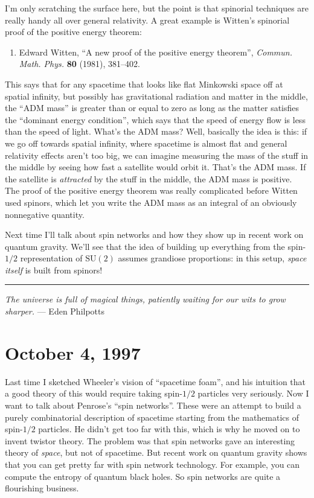 \documentclass{article}
\def\tightlist{}
\begin{document}
I'm only scratching the surface here, but the point is that spinorial
techniques are really handy all over general relativity. A great example
is Witten's spinorial proof of the positive energy theorem:

\begin{enumerate}
\def\labelenumi{\arabic{enumi})}
\setcounter{enumi}{5}
\tightlist
\item
  Edward Witten, ``A new proof of the positive energy theorem'',
  \emph{Commun. Math. Phys.} \textbf{80} (1981), 381--402.
\end{enumerate}

This says that for any spacetime that looks like flat Minkowski space
off at spatial infinity, but possibly has gravitational radiation and
matter in the middle, the ``ADM mass'' is greater than or equal to zero
as long as the matter satisfies the ``dominant energy condition'', which
says that the speed of energy flow is less than the speed of light.
What's the ADM mass? Well, basically the idea is this: if we go off
towards spatial infinity, where spacetime is almost flat and general
relativity effects aren't too big, we can imagine measuring the mass of
the stuff in the middle by seeing how fast a satellite would orbit it.
That's the ADM mass. If the satellite is \emph{attracted} by the stuff
in the middle, the ADM mass is positive. The proof of the positive
energy theorem was really complicated before Witten used spinors, which
let you write the ADM mass as an integral of an obviously nonnegative
quantity.

Next time I'll talk about spin networks and how they show up in recent
work on quantum gravity. We'll see that the idea of building up
everything from the spin-\(1/2\) representation of \(\mathrm{SU}(2)\)
assumes grandiose proportions: in this setup, \emph{space itself} is
built from spinors!

\begin{center}\rule{0.5\linewidth}{0.5pt}\end{center}

\emph{The universe is full of magical things, patiently waiting for our
wits to grow sharper.} --- Eden Philpotts
\hypertarget{week110}{%
\section{October 4, 1997}\label{week110}}

Last time I sketched Wheeler's vision of ``spacetime foam'', and his
intuition that a good theory of this would require taking spin-\(1/2\)
particles very seriously. Now I want to talk about Penrose's ``spin
networks''. These were an attempt to build a purely combinatorial
description of spacetime starting from the mathematics of spin-\(1/2\)
particles. He didn't get too far with this, which is why he moved on to
invent twistor theory. The problem was that spin networks gave an
interesting theory of \emph{space}, but not of spacetime. But recent
work on quantum gravity shows that you can get pretty far with spin
network technology. For example, you can compute the entropy of quantum
black holes. So spin networks are quite a flourishing business.
\end{document}
